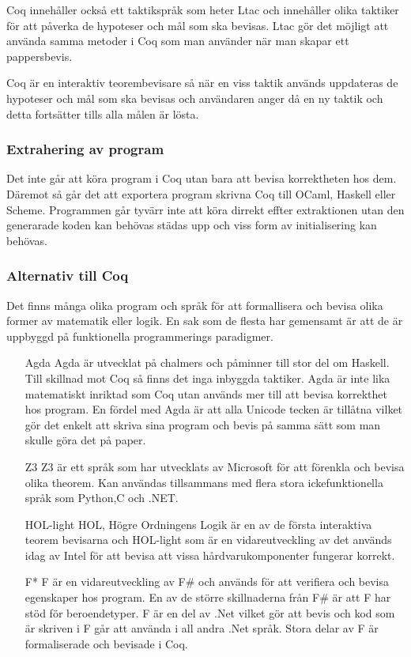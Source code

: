 Coq innehåller också ett taktikspråk som heter Ltac och innehåller olika
taktiker för att påverka de hypoteser och mål som ska bevisas.
Ltac gör det möjligt att använda samma metoder i Coq som man använder
när man skapar ett pappersbevis.

Coq är en interaktiv teorembevisare så när en viss taktik används uppdateras
de hypoteser och mål som ska bevisas och användaren anger då en ny taktik
och detta fortsätter tills alla målen är lösta.


\subsubsection{Extrahering av program}
Det inte går att köra program i Coq utan bara att bevisa korrektheten hos
dem. Däremot så går det att exportera program skrivna Coq till OCaml, Haskell
eller Scheme. Programmen går tyvärr inte att köra dirrekt effter extraktionen
utan den generarade koden kan behövas städas upp och viss form av
initialisering kan behövas.


\subsubsection{Alternativ till Coq}
Det finns många olika program och språk för att formallisera och bevisa olika
former av matematik eller logik. En sak som de flesta har gemensamt är att de är
uppbyggd på funktionella programmerings paradigmer.

\begin{itemize}

\item[Agda]
Agda är utvecklat på chalmers och påminner till stor del om Haskell. Till
skillnad mot Coq så finns det inga inbyggda taktiker.  Agda är inte lika
matematiskt inriktad som Coq utan används mer till att bevisa korrekthet hos
program. En fördel med Agda är att alla Unicode tecken är tillåtna vilket gör
det enkelt att skriva sina program och bevis på samma sätt som man skulle göra
det på paper.
\item[Z3]
Z3 är ett språk som har utvecklats av Microsoft för att förenkla och bevisa
olika theorem. Kan användas tillsammans med flera stora ickefunktionella
språk som Python,C och .NET.


\item[HOL-light]
HOL, Högre Ordningens Logik är en av de första interaktiva teorem bevisarna och
HOL-light som är en vidareutveckling av det används idag av Intel för att bevisa
att vissa hårdvarukomponenter fungerar korrekt.

\item[F*]
F\* är en vidareutveckling av F\# och används för att verifiera och bevisa
egenskaper hos program. En av de större skillnaderna från F\# är att F\*
har stöd för beroendetyper. F\* är en del av .Net vilket gör att bevis och kod
som är skriven i F\* går att använda i all andra .Net språk.
Stora delar av F\* är formaliserade och bevisade i Coq.
\end{itemize}


\begin{comment}
Källor och annat material
HOL http://www.cl.cam.ac.uk/~jrh13/hol-light/
Z3 http://research.microsoft.com/en-us/um/redmond/projects/z3/old/
F* http://research.microsoft.com/en-us/projects/fstar/
\end{comment}

